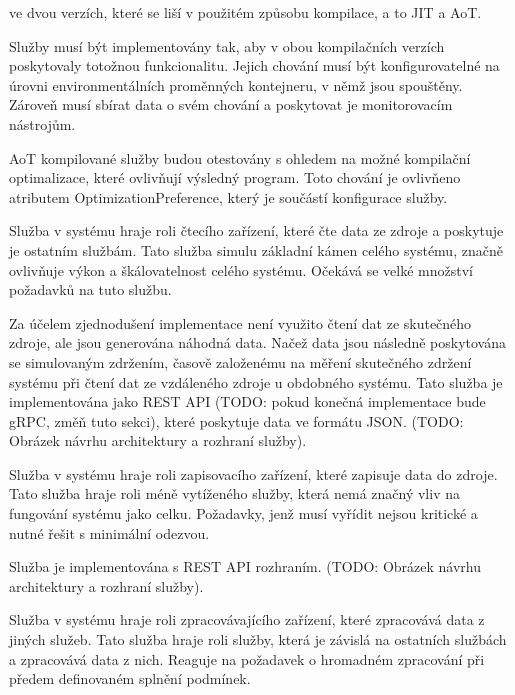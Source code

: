 ve dvou verzích, které se liší v použitém způsobu kompilace, a to JIT a AoT.



Služby musí být implementovány tak, aby v obou kompilačních verzích poskytovaly totožnou funkcionalitu. Jejich chování musí být konfigurovatelné na úrovni environmentálních proměnných kontejneru, v němž jsou spouštěny. Zároveň musí sbírat data o svém chování a poskytovat je monitorovacím nástrojům.

AoT kompilované služby budou otestovány s ohledem na možné kompilační optimalizace, které ovlivňují výsledný program. Toto chování je ovlivňeno atributem OptimizationPreference, který je součástí konfigurace služby.



Služba v systému hraje roli čtecího zařízení, které čte data ze zdroje a poskytuje je ostatním službám. Tato služba simulu základní kámen celého systému, značně ovlivňuje výkon a škálovatelnost celého systému. Očekává se velké množství požadavků na tuto službu.

Za účelem zjednodušení implementace není využito čtení dat ze skutečného zdroje, ale jsou generována náhodná data. Načež data jsou následně poskytována se simulovaným zdržením, časově založenému na měření skutečného zdržení systému při čtení dat ze vzdáleného zdroje u obdobného systému. Tato služba je implementována jako REST API (TODO: pokud konečná implementace bude gRPC, změň tuto sekci), které poskytuje data ve formátu JSON. (TODO: Obrázek návrhu architektury a rozhraní služby).


Služba v systému hraje roli zapisovacího zařízení, které zapisuje data do zdroje. Tato služba hraje roli méně vytíženého služby, která nemá značný vliv na fungování systému jako celku. Požadavky, jenž musí vyřídit nejsou kritické a nutné řešit s minimální odezvou.

Služba je implementována s REST API rozhraním. (TODO: Obrázek návrhu architektury a rozhraní služby).


Služba v systému hraje roli zpracovávajícího zařízení, které zpracovává data z jiných služeb. Tato služba hraje roli služby, která je závislá na ostatních službách a zpracovává data z nich. Reaguje na požadavek o hromadném zpracování při předem definovaném splnění podmínek.

